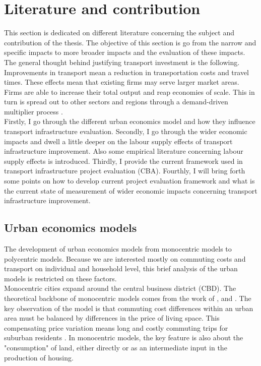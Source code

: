 \section{Literature and contribution} 

This section is dedicated on different literature concerning the subject and contribution of the thesis. The objective of this section is go from the narrow and specific impacts to more broader impacts and the evaluation of these impacts. The general thought behind justifying transport investment is the following. Improvements in transport mean a reduction in transportation costs and travel times. These effects mean that existing firms may serve larger market areas. Firms are able to increase their total output and reap economies of scale. This in turn is spread out to other sectors and regions through a demand-driven multiplier process \citep{oosterhaven}. \\

Firstly, I go through the different urban economics model and how they influence transport infrastructure evaluation. Secondly, I go through the wider economic impacts and dwell a little deeper on the labour supply effects of transport infrastructure improvement. Also some empirical literature concerning labour supply effects is introduced. Thirdly, I provide the current framework used in transport infrastructure project evaluation (CBA). Fourthly, I will bring forth some points on how to develop current project evaluation framework and what is the current state of measurement of wider economic impacts concerning transport infrastructure improvement. \\

\subsection{Urban economics models}

The development of urban economics models from monocentric models to polycentric models. Because we are interested mostly on commuting costs and transport on individual and household level, this brief analysis of the urban models is restricted on these factors. \\

Monocentric cities expand around the central business district (CBD). The theoretical backbone of monocentric models comes from the work of \cite{alonso}, \cite{mills} and \cite{muth}. The key observation of the model is that commuting cost differences within an urban area must be balanced by differences in the price of living space. This compensating price variation means long and costly commuting trips for suburban residents \citep{brueckner}. In monocentric models, the key feature is also about the "consumption" of land, either directly or as an intermediate input in the production of housing. \\


